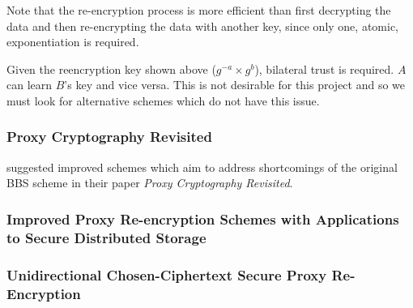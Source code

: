 Note that the re-encryption process is more efficient than first decrypting the data and then re-encrypting the data with another key, since only one, atomic, exponentiation is required.

Given the reencryption key shown above ($g^{-a} \times g^{b}$), bilateral trust is required. $A$ can learn $B$'s key and vice versa. This is not desirable for this project and so we must look for alternative schemes which do not have this issue.

\subsubsection{Proxy Cryptography Revisited}

\cite{ivandodis:2003:inproceedings} suggested improved schemes which aim to address shortcomings of the original BBS scheme in their paper \textit{Proxy Cryptography Revisited}.



\subsubsection{Improved Proxy Re-encryption Schemes with Applications to Secure Distributed Storage~\cite{afgh:2006:article}}

\subsubsection{Unidirectional Chosen-Ciphertext Secure Proxy Re-Encryption~\cite{lv11:2011:article}}
